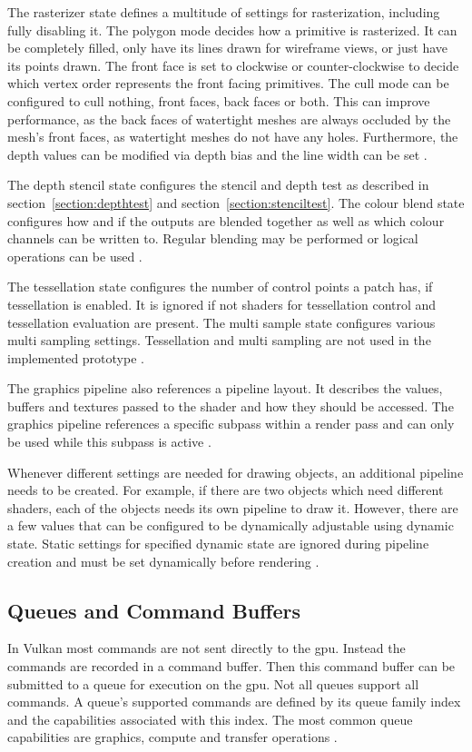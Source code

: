 The rasterizer state defines a multitude of settings for rasterization, including fully disabling it. The polygon mode decides how a primitive is rasterized. It can be completely filled, only have its lines drawn for wireframe views, or just have its points drawn. The front face is set to clockwise or counter-clockwise to decide which vertex order represents the front facing primitives. The cull mode can be configured to cull nothing, front faces, back faces or both. This can improve performance, as the back faces of watertight meshes are always occluded by the mesh's front faces, as watertight meshes do not have any holes. Furthermore, the depth values can be modified via depth bias and the line width can be set \cite{khronos:vulkan:spec1.1}.

The depth stencil state configures the stencil and depth test as described in section~\ref{section:depthtest} and section~\ref{section:stenciltest}. The colour blend state configures how and if the outputs are blended together as well as which colour channels can be written to. Regular blending may be performed or logical operations can be used \cite{khronos:vulkan:spec1.1}.

The tessellation state configures the number of control points a patch has, if tessellation is enabled. It is ignored if not shaders for tessellation control and tessellation evaluation are present. The multi sample state configures various multi sampling settings. Tessellation and multi sampling are not used in the implemented prototype \cite{khronos:vulkan:spec1.1}.

The graphics pipeline also references a pipeline layout. It describes the values, buffers and textures passed to the shader and how they should be accessed. The graphics pipeline references a specific subpass within a render pass and can only be used while this subpass is active \cite{khronos:vulkan:spec1.1}.

Whenever different settings are needed for drawing objects, an additional pipeline needs to be created. For example, if there are two objects which need different shaders, each of the objects needs its own pipeline to draw it. However, there are a few values that can be configured to be dynamically adjustable using dynamic state. Static settings for specified dynamic state are ignored during pipeline creation and must be set dynamically before rendering \cite{khronos:vulkan:spec1.1}.

\subsection{Queues and Command Buffers}
In Vulkan most commands are not sent directly to the \gls{gpu}. Instead the commands are recorded in a command buffer. Then this command buffer can be submitted to a queue for execution on the \gls{gpu}. Not all queues support all commands. A queue's supported commands are defined by its queue family index and the capabilities associated with this index. The most common queue capabilities are graphics, compute and transfer operations \cite{khronos:vulkan:spec1.1}.

